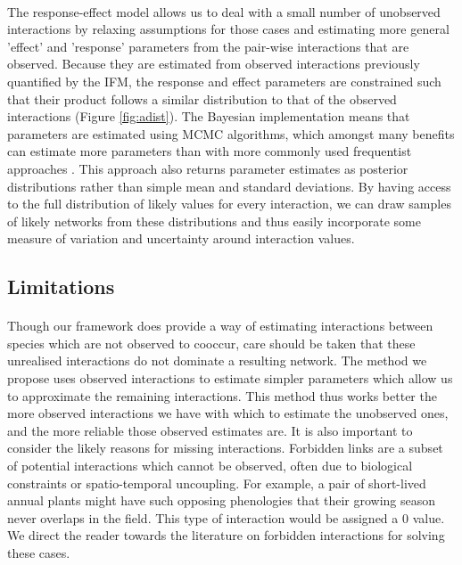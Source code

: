 \documentclass[a4,12pt]{article}
\begin{document}
    \paragraph{}
    The response-effect model allows us to deal with a small number of unobserved interactions by relaxing assumptions for those cases and estimating more general 'effect' and 'response' parameters from the pair-wise interactions that are observed. Because they are estimated from observed interactions previously quantified by the IFM, the response and effect parameters are constrained such that their product follows a similar distribution to that of the observed interactions (Figure \ref{fig:adist}). The Bayesian implementation means that parameters are estimated using MCMC algorithms, which amongst many benefits can estimate more parameters than with more commonly used frequentist approaches \parencite{Dorazio2016}. This approach also returns parameter estimates as posterior distributions rather than simple mean and standard deviations. By having access to the full distribution of likely values for every interaction, we can draw samples of likely networks from these distributions and thus easily incorporate some measure of variation and uncertainty around interaction values. 

    \subsection{Limitations}
        
        \paragraph{}
        Though our framework does provide a way of estimating interactions between species which are not observed to cooccur, care should be taken that these unrealised interactions do not dominate a resulting network. The method we propose uses observed interactions to estimate simpler parameters which allow us to approximate the remaining interactions. This method thus works better the more observed interactions we have with which to estimate the unobserved ones, and the more reliable those observed estimates are. It is also important to consider the likely reasons for missing interactions. Forbidden links are a subset of potential interactions which cannot be observed, often due to biological constraints or spatio-temporal uncoupling. For example, a pair of short-lived annual plants might have such opposing phenologies that their growing season never overlaps in the field. This type of interaction would be assigned a 0 value. We direct the reader towards the literature on forbidden interactions \parencite{Olesen2011, Jordano2016} for solving these cases. 
\end{document}
